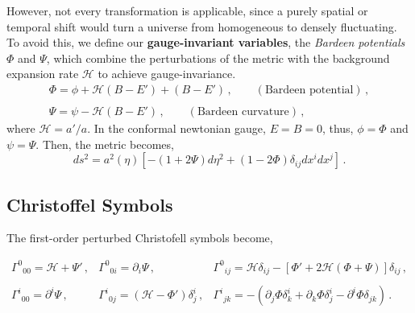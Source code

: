 \documentclass{book}
\begin{document}
	However, not every transformation is applicable, since a purely spatial or temporal shift would turn a universe from homogeneous to densely fluctuating. To avoid this, we define our \textbf{gauge-invariant variables}, the \textit{Bardeen potentials} $\Phi$ and $\Psi$, which combine the perturbations of the metric with the background expansion rate $\mathcal{H}$ to achieve gauge-invariance.
	\begin{equation}
		\begin{array}{c}
			\Phi = \phi + \mathcal{H}(B-E')+(B-E') \, , \qquad (\text{Bardeen potential}) \, , \\ \, \\
			\Psi = \psi - \mathcal{H}(B-E') \, , \qquad (\text{Bardeen curvature}) \, ,
		\end{array}
	\end{equation} 
	where $\mathcal{H}=a'/a$. In the conformal newtonian gauge, $E=B=0$, thus, $\phi=\Phi$ and $\psi=\Psi$. Then, the metric becomes,
	\begin{equation}
		\label{Newtonian_FLRW}
		ds^2=a^2(\eta)\left[ -(1+2\Psi) d\eta^2 +(1-2\Phi) \delta_{ij}dx^i dx^j \right] \, .
	\end{equation}
	\subsection*{Christoffel Symbols}
	The first-order perturbed Christofell symbols become,
	
	\begin{equation}
		\begin{array}{ccc}
			 {\Gamma^0}_{00}=\mathcal{H}+\Psi' \, , &  {\Gamma^0}_{0i}=\partial_i \Psi \, , &  {\Gamma^0}_{ij}=\mathcal{H} \delta_{ij} - \left[ \Phi'+2\mathcal{H}(\Phi+\Psi) \right] \delta_{ij} \, , \\ \, & \, & \,  \\
			 {\Gamma^i}_{00}=\partial^i \Psi \, , &  {\Gamma^i}_{0j} = (\mathcal{H}-\Phi' )\delta^i_j \, , &  {\Gamma^i}_{jk} = - (\partial_j \Phi \delta^i_k + \partial_k \Phi \delta^i_j - \partial^i \Phi \delta_{jk}) \, .
 		\end{array}
	\end{equation}
	
	
\end{document}

